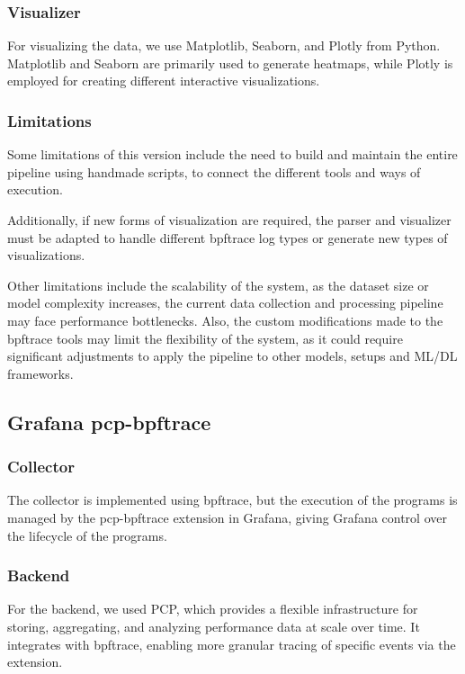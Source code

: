 \documentclass[conference]{IEEEtran}
\begin{document}
\subsubsection{Visualizer}

For visualizing the data, we use Matplotlib, Seaborn, and Plotly from Python.
Matplotlib and Seaborn are primarily used to generate heatmaps, while Plotly is employed for creating different interactive visualizations.

\subsubsection{Limitations}

Some limitations of this version include the need to build and maintain the entire pipeline using handmade scripts, to connect the different tools and ways of execution.

Additionally, if new forms of visualization are required, the parser and visualizer must be adapted to handle different bpftrace log types or generate new types of visualizations.

Other limitations include the scalability of the system, as the dataset size or model complexity increases, the current data collection and processing pipeline may face performance bottlenecks.
Also, the custom modifications made to the bpftrace tools may limit the flexibility of the system, as it could require significant adjustments to apply the pipeline to other models, setups and ML/DL frameworks.

\subsection{Grafana pcp-bpftrace}

\subsubsection{Collector}

The collector is implemented using bpftrace, but the execution of the programs is managed by the pcp-bpftrace extension in Grafana, giving Grafana control over the lifecycle of the programs.

\subsubsection{Backend}

For the backend, we used PCP, which provides a flexible infrastructure for storing, aggregating, and analyzing performance data at scale over time.
It integrates with bpftrace, enabling more granular tracing of specific events via the extension.
\end{document}
